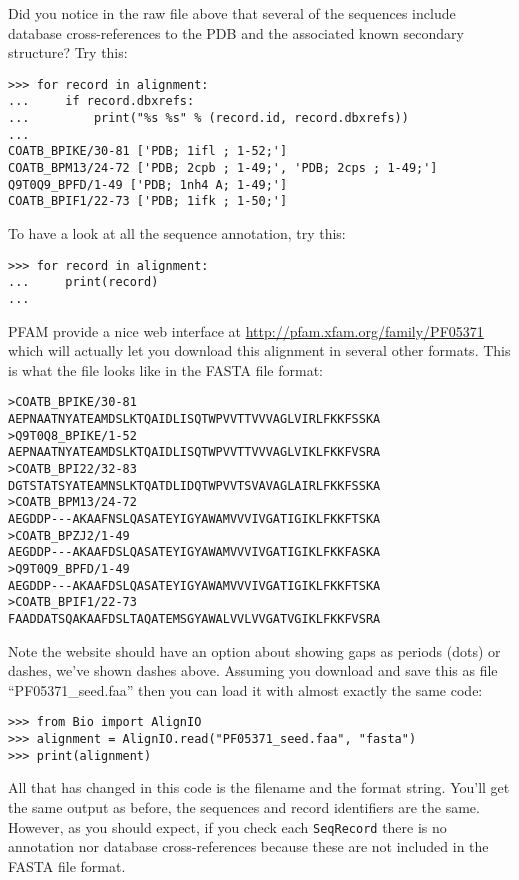 Did you notice in the raw file above that several of the sequences include database cross-references to the PDB and the associated known secondary structure?  Try this:

\begin{verbatim}
>>> for record in alignment:
...     if record.dbxrefs:
...         print("%s %s" % (record.id, record.dbxrefs))
...
COATB_BPIKE/30-81 ['PDB; 1ifl ; 1-52;']
COATB_BPM13/24-72 ['PDB; 2cpb ; 1-49;', 'PDB; 2cps ; 1-49;']
Q9T0Q9_BPFD/1-49 ['PDB; 1nh4 A; 1-49;']
COATB_BPIF1/22-73 ['PDB; 1ifk ; 1-50;']
\end{verbatim}

\noindent To have a look at all the sequence annotation, try this:

\begin{verbatim}
>>> for record in alignment:
...     print(record)
...
\end{verbatim}

PFAM provide a nice web interface at \url{http://pfam.xfam.org/family/PF05371} which will actually let you download this alignment in several other formats.  This is what the file looks like in the FASTA file format:

\begin{verbatim}
>COATB_BPIKE/30-81
AEPNAATNYATEAMDSLKTQAIDLISQTWPVVTTVVVAGLVIRLFKKFSSKA
>Q9T0Q8_BPIKE/1-52
AEPNAATNYATEAMDSLKTQAIDLISQTWPVVTTVVVAGLVIKLFKKFVSRA
>COATB_BPI22/32-83
DGTSTATSYATEAMNSLKTQATDLIDQTWPVVTSVAVAGLAIRLFKKFSSKA
>COATB_BPM13/24-72
AEGDDP---AKAAFNSLQASATEYIGYAWAMVVVIVGATIGIKLFKKFTSKA
>COATB_BPZJ2/1-49
AEGDDP---AKAAFDSLQASATEYIGYAWAMVVVIVGATIGIKLFKKFASKA
>Q9T0Q9_BPFD/1-49
AEGDDP---AKAAFDSLQASATEYIGYAWAMVVVIVGATIGIKLFKKFTSKA
>COATB_BPIF1/22-73
FAADDATSQAKAAFDSLTAQATEMSGYAWALVVLVVGATVGIKLFKKFVSRA
\end{verbatim}

\noindent Note the website should have an option about showing gaps as periods (dots) or dashes, we've shown dashes above.  Assuming you download and save this as file ``PF05371\_seed.faa'' then you can load it with almost exactly the same code:

\begin{verbatim}
>>> from Bio import AlignIO
>>> alignment = AlignIO.read("PF05371_seed.faa", "fasta")
>>> print(alignment)
\end{verbatim}

All that has changed in this code is the filename and the format string.  You'll get the same output as before, the sequences and record identifiers are the same.
However, as you should expect, if you check each \verb|SeqRecord| there is no annotation nor database cross-references because these are not included in the FASTA file format.

